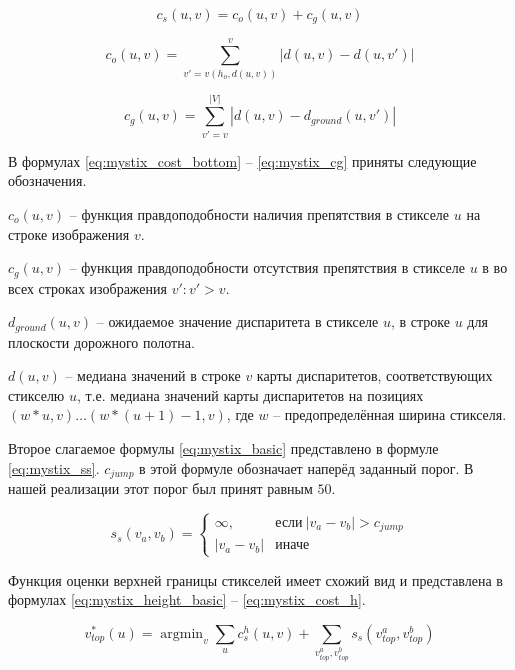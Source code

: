 \documentclass[aps,%
14pt,%
final,%
oneside,
onecolumn,%
musixtex, %
superscriptaddress,%
centertags]{extarticle} %
\DeclareMathOperator*{\argmin}{argmin}
\begin{document}
\begin{equation}\label{eq:mystix_cost_bottom}
c_s(u, v) = c_o(u, v) + c_g(u, v)
\end{equation}

\begin{equation}\label{eq:mystix_co}
c_o(u, v) = \sum_{v'=v(h_o, d(u, v))}^{v} |d(u, v) - d(u, v')|
\end{equation}

\begin{equation}\label{eq:mystix_cg}
c_g(u, v) = \sum_{v'=v}^{|V|} |d(u, v) - d_{ground}(u, v')|
\end{equation}

В формулах \ref{eq:mystix_cost_bottom} -- \ref{eq:mystix_cg} приняты следующие обозначения.

$c_o(u, v)$ -- функция правдоподобности наличия препятствия в стикселе $u$ на строке изображения $v$.

$c_g(u, v)$ -- функция правдоподобности отсутствия препятствия в стикселе $u$ в во всех строках изображения $v' : v' > v$.

$d_{ground}(u, v)$ -- ожидаемое значение диспаритета в стикселе $u$, в строке $u$ для плоскости дорожного полотна.

$d(u, v)$ -- медиана значений в строке $v$ карты диспаритетов, соответствующих стикселю $u$, т.е. медиана значений карты диспаритетов на позициях $(w * u, v)\dots (w * (u + 1) - 1, v)$, где $w$ -- предопределённая ширина стикселя.

Второе слагаемое формулы \ref{eq:mystix_basic} представлено в формуле \ref{eq:mystix_ss}. $c_{jump}$ в этой формуле обозначает наперёд заданный порог. В нашей реализации этот порог был принят равным $50$.

\begin{equation}\label{eq:mystix_ss}
s_s(v_a, v_b)=
\begin{cases}
  \infty,     & \text{если}\ |v_a - v_b| > c_{jump} \\
  |v_a - v_b| & \text{иначе}
\end{cases}
\end{equation}

Функция оценки верхней границы стикселей имеет схожий вид и представлена в формулах \ref{eq:mystix_height_basic} -- \ref{eq:mystix_cost_h}.

\begin{equation}\label{eq:mystix_height_basic}
v_{top}^*(u) = \argmin_{v}\sum_u c_s^h(u, v) + \sum_{v_{top}^a, v_{top}^b} s_s(v_{top}^a, v_{top}^b)
\end{equation}
\end{document}
